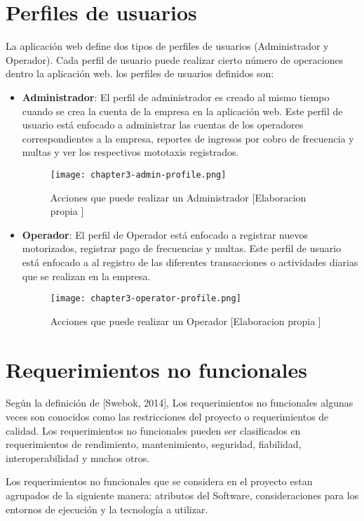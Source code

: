\section{Perfiles de usuarios}
\noindent La aplicación web define dos tipos de perfiles de usuarios (Administrador y Operador). Cada perfil de  usuario puede realizar cierto número de operaciones dentro la aplicación web.
\noindent los perfiles de usuarios definidos son:
\begin{itemize}
\item \textbf{Administrador}: El perfil de administrador es creado al mismo tiempo cuando se crea la cuenta de la empresa en la aplicación web. Este perfil de usuario está enfocado a administrar las cuentas de los operadores correspondientes a la empresa, reportes de ingresos por cobro de frecuencia y multas y ver los respectivos mototaxis registrados.
\begin{figure}[ht]
  \centering
  \texttt{[image: chapter3-admin-profile.png]}
  \caption{Acciones que puede realizar un Administrador [Elaboracion propia ]}  
\end{figure}
\item \textbf{Operador}: El perfil de Operador está enfocado a registrar nuevos motorizados, registrar pago de frecuencias y multas. Este perfil de usuario está enfocado a al registro de las diferentes transacciones o actividades diarias que se realizan en la empresa.
\begin{figure}[ht]
  \centering
  \texttt{[image: chapter3-operator-profile.png]}
  \caption{Acciones que puede realizar un Operador [Elaboracion propia ]}  
\end{figure}
\end{itemize}

\section{Requerimientos no funcionales}
\noindent Según la definición de [Swebok, 2014], Los requerimientos no funcionales algunas veces son conocidos como las restricciones del proyecto o requerimientos de calidad. Los requerimientos no funcionales pueden ser clasificados en requerimientos de rendimiento, mantenimiento, seguridad, fiabilidad, interoperabilidad y muchos otros.

\noindent Los requerimientos no funcionales que se considera en el proyecto estan agrupados de la siguiente manera: atributos del Software, consideraciones para los entornos de ejecución y la tecnología a utilizar.

